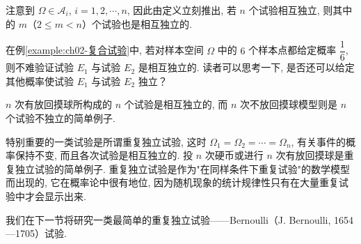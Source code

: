 \documentclass[../../main.tex]{subfiles}
\begin{document}
注意到 $\Omega\in\mathscr{A}_i$, $i=1,2,\cdots,n$, 因此由定义立刻推出, 若 $n$ 个试验相互独立, 则其中的 $m$（$2\leqslant m<n$）个试验也是相互独立的.

在例\ref{example:ch02-复合试验}中, 若对样本空间 $\Omega$ 中的 $6$ 个样本点都给定概率 $\dfrac{1}{6}$, 则不难验证试验 $E_1$ 与试验 $E_2$ 是相互独立的. 读者可以思考一下, 是否还可以给定其他概率使试验 $E_1$ 与试验 $E_2$ 独立？

$n$ 次有放回摸球所构成的 $n$ 个试验是相互独立的, 而 $n$ 次不放回摸球模型则是 $n$ 个试验不独立的简单例子.

特别重要的一类试验是所谓重复独立试验, 这时 $\Omega_1=\Omega_2=\cdots=\Omega_n$, 有关事件的概率保持不变, 而且各次试验是相互独立的. 投 $n$ 次硬币或进行 $n$ 次有放回摸球是重复独立试验的简单例子. 重复独立试验是作为"在同样条件下重复试验"的数学模型而出现的, 它在概率论中很有地位, 因为随机现象的统计规律性只有在大量重复试验中才会显示出来.

我们在下一节将研究一类最简单的重复独立试验——Bernoulli（J. Bernoulli, 1654—1705）试验.
\end{document}
